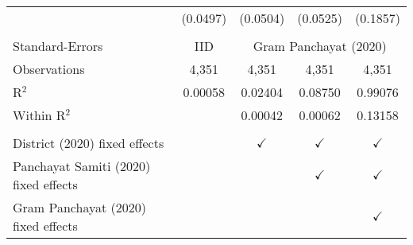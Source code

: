 \begin{tabular}{lcccc}
                                                           & (0.0497) & (0.0504)      & (0.0525)      & (0.1857)\\   
    \\
   Standard-Errors & IID & \multicolumn{3}{c}{Gram Panchayat (2020)} \\ 
   Observations                                            & 4,351    & 4,351         & 4,351         & 4,351\\  
   R$^2$                                                   & 0.00058  & 0.02404       & 0.08750       & 0.99076\\  
   Within R$^2$                                            &          & 0.00042       & 0.00062       & 0.13158\\  
    \\
   District (2020) fixed effects                           &          & $\checkmark$  & $\checkmark$  & $\checkmark$\\   
   Panchayat Samiti (2020) fixed effects                   &          &               & $\checkmark$  & $\checkmark$\\   
   Gram Panchayat (2020) fixed effects                     &          &               &               & $\checkmark$\\   
   \bottomrule
\end{tabular}
\par\endgroup


